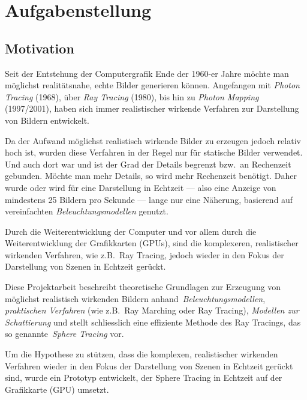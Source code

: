 
\chapter{Aufgabenstellung}
\label{chap:scope}

\section{Motivation}
\label{sec:motivation}

Seit der Entstehung der Computergrafik Ende der 1960-er Jahre möchte man
möglichst realitätsnahe, echte Bilder generieren können. Angefangen mit
\textit{Photon Tracing} (1968), über \textit{Ray Tracing} (1980), bis hin
zu \textit{Photon Mapping} (1997/2001), haben sich immer realistischer
wirkende Verfahren zur Darstellung von Bildern entwickelt.

Da der Aufwand möglichst realistisch wirkende Bilder zu erzeugen jedoch
relativ hoch ist, wurden diese Verfahren in der Regel nur für statische
Bilder verwendet. Und auch dort war und ist der Grad der Details
begrenzt bzw.\ an Rechenzeit gebunden. Möchte man mehr Details, so wird
mehr Rechenzeit benötigt. Daher wurde oder wird für eine Darstellung in
Echtzeit --- also eine Anzeige von mindestens 25 Bildern pro
Sekunde --- lange nur eine Näherung, basierend auf vereinfachten
\textit{Beleuchtungsmodellen} genutzt.

Durch die Weiterentwicklung der Computer und vor allem durch die
Weiterentwicklung der Grafikkarten (GPUs), sind die komplexeren,
realistischer wirkenden Verfahren, wie z.B.\ Ray Tracing, jedoch
wieder in den Fokus der Darstellung von Szenen in Echtzeit gerückt.

Diese Projektarbeit beschreibt theoretische Grundlagen zur Erzeugung von
möglichst realistisch wirkenden Bildern
anhand~\textit{Beleuchtungsmodellen}, \textit{praktischen Verfahren}
(wie z.B.\ Ray Marching oder Ray Tracing), \textit{Modellen zur
    Schattierung} und stellt schliesslich eine effiziente Methode des
Ray Tracings, das so genannte~\textit{Sphere Tracing} vor.

Um die Hypothese zu stützen, dass die komplexen, realistischer wirkenden
Verfahren wieder in den Fokus der Darstellung von Szenen in Echtzeit
gerückt sind, wurde ein Prototyp entwickelt, der Sphere Tracing in
Echtzeit auf der Grafikkarte (GPU) umsetzt.


